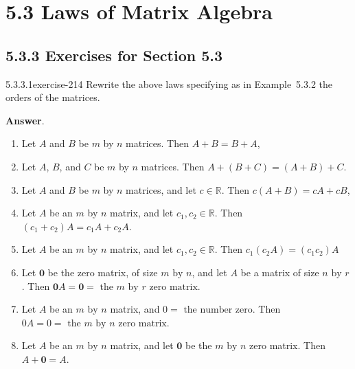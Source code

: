 \documentclass[twoside,10pt,]{book}
\numberwithin{equation}{section}
\begin{document}
\section*{5.3 Laws of Matrix Algebra}
\subsection*{5.3.3 Exercises for Section 5.3}
\begin{divisionsolution}{5.3.3.1}{}{exercise-214}%
\hypertarget{p-1848}{}%
Rewrite the above laws specifying as in Example~5.3.2 the orders of the matrices.%
\par\smallskip%
\noindent\textbf{Answer}.\quad%
\hypertarget{p-1849}{}%
\leavevmode%
\begin{enumerate}[label=(\alph*)]
\item\hypertarget{li-977}{}\hypertarget{p-1850}{}%
Let \(A\) and \(B\) be \(m\) by \(n\) matrices. Then \(A+B=B+A\),%
\item\hypertarget{li-978}{}\hypertarget{p-1851}{}%
Let \(A\), \(B\), and \(C\) be \(m\) by \(n\) matrices. Then \(A+(B+C)=(A+B)+C\).%
\item\hypertarget{li-979}{}\hypertarget{p-1852}{}%
Let \(A\) and \(B\) be \(m\) by \(n\) matrices, and let \(c\in \mathbb{R}\). Then \(c(A+B)=cA+cB\),%
\item\hypertarget{li-980}{}\hypertarget{p-1853}{}%
Let \(A\) be an \(m\) by \(n\) matrix, and let \(c_1,c_2\in \mathbb{R}\). Then \(\left(c_1+c_2\right)A=c_1A+c_2A\).%
\item\hypertarget{li-981}{}\hypertarget{p-1854}{}%
Let \(A\) be an \(m\) by \(n\) matrix, and let \(c_1,c_2\in \mathbb{R}\). Then \(c_1\left(c_2A\right)=\left(c_1c_2\right)A\)%
\item\hypertarget{li-982}{}\hypertarget{p-1855}{}%
Let \(\pmb{0}\) be the zero matrix, of size \(m \textrm{ by } n\), and let \(A\) be a matrix of size \(n \textrm{ by } r\). Then \(\pmb{0}A=\pmb{0}=\textrm{ the } m \textrm{ by } r \textrm{ zero matrix}\).%
\item\hypertarget{li-983}{}\hypertarget{p-1856}{}%
Let \(A\) be an \(m \textrm{ by } n\) matrix, and \(0 = \textrm{ the number zero}\). Then \(0A=0=\textrm{ the } m \textrm{ by } n \textrm{ zero matrix}\).%
\item\hypertarget{li-984}{}\hypertarget{p-1857}{}%
Let \(A\) be an \(m \textrm{ by } n\) matrix, and let \(\pmb{0}\) be the \(m \textrm{ by } n\) zero matrix. Then \(A+\pmb{0}=A\).%

\end{enumerate}
\end{divisionsolution}
\end{document}
